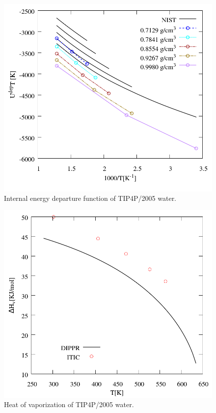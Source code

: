 \documentclass[%
 aip,
 jcp,
 sd,%
 amsmath,amssymb,
]{revtex4-1}
\begin{document}
\begin{figure}[!htbp]
\includegraphics[scale=0.35]{Figures/EXAMPLE-SIM_TIP4P05_udep.png}
\caption{Internal energy departure function of TIP4P/2005 water.}
\label{fig:EXAMPLE-SIM/TIP4P05/udep}
\end{figure}

\begin{figure}[!htbp]
\includegraphics[scale=0.35]{Figures/EXAMPLE-SIM_TIP4P05_hvap.png}
\caption{Heat of vaporization of TIP4P/2005 water.}
\label{fig:EXAMPLE-SIM/TIP4P05/hvap}
\end{figure}
\end{document}

